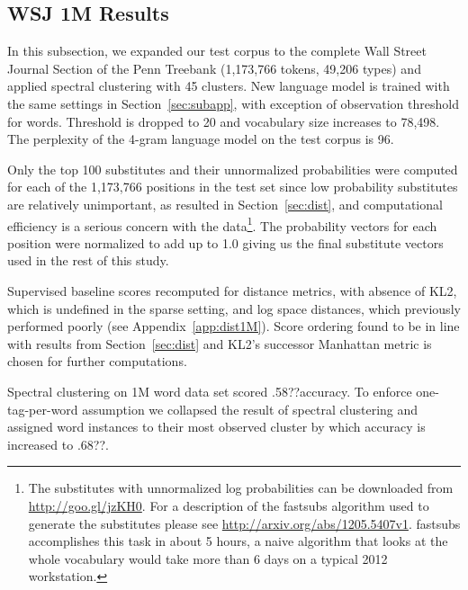 \subsection{WSJ 1M Results}
\label{sec:wsj}

In this subsection, we expanded our test corpus to the complete Wall
Street Journal Section of the Penn Treebank \cite{treebank3}
(1,173,766 tokens, 49,206 types) and applied spectral clustering with
45 clusters.
%
New language model is trained with the same settings in
Section~\ref{sec:subapp}, with exception of observation threshold for
words.  Threshold is dropped to 20 and vocabulary size increases to
78,498.
%
The perplexity of the 4-gram language model on the test corpus is 96.

Only the top 100 substitutes and their unnormalized probabilities were
computed for each of the 1,173,766 positions in the test set since low
probability substitutes are relatively unimportant, as resulted in
Section~\ref{sec:dist}, and computational efficiency is a serious
concern with the data\footnote{The substitutes with unnormalized log
  probabilities can be downloaded from
  \mbox{\url{http://goo.gl/jzKH0}}.  For a description of the {\sc
    fastsubs} algorithm used to generate the substitutes please see
  \mbox{\url{http://arxiv.org/abs/1205.5407v1}}.  {\sc fastsubs}
  accomplishes this task in about 5 hours, a naive algorithm that
  looks at the whole vocabulary would take more than 6 days on a
  typical 2012 workstation.}.  The probability vectors for each
position were normalized to add up to 1.0 giving us the final
substitute vectors used in the rest of this study.

Supervised baseline scores recomputed for distance metrics, with
absence of KL2, which is undefined in the sparse setting, and log
space distances, which previously performed poorly
(see Appendix~\ref{app:dist1M}). Score ordering found to be in line with
results from Section~\ref{sec:dist} and KL2's successor Manhattan
metric is chosen for further computations.


Spectral clustering on 1M word data set scored .58??\mto accuracy.  To
enforce one-tag-per-word assumption we collapsed the result of
spectral clustering and assigned word instances to their most observed
cluster by which \mto accuracy is increased to .68??.
